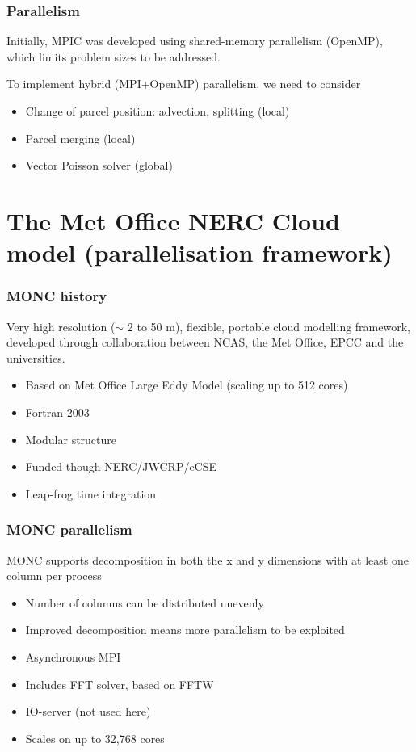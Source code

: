 \documentclass{beamer}
\begin{document}
\begin{frame}
\frametitle{Parallelism}

Initially, MPIC was developed using shared-memory parallelism (OpenMP), which limits problem sizes to be addressed.

To implement hybrid (MPI+OpenMP) parallelism, we need to consider

\begin{itemize}
\item Change of parcel position: advection, splitting (local)
\item Parcel merging (local)
\item Vector Poisson solver (global)
\end{itemize}

\end{frame}

\section{The Met Office NERC Cloud model (parallelisation framework)}

 
\begin{frame}
\frametitle{MONC history}

Very high resolution ($\mathsf{\sim}$ 2 to 50 m), flexible, portable cloud modelling 
framework, developed through collaboration between NCAS, the Met 
Office, EPCC and the universities.
\begin{itemize}
\item Based on Met Office Large Eddy Model (scaling up to 512 cores)
\item Fortran 2003
\item Modular structure
\item Funded though NERC/JWCRP/eCSE
\item Leap-frog time integration
\end{itemize}
\end{frame}

\begin{frame}
\frametitle{MONC parallelism}

MONC supports decomposition in both the x and y dimensions with at least one column per process
\begin{itemize}
\item Number of columns can be distributed unevenly
\item Improved decomposition means more parallelism to be exploited
\item Asynchronous MPI
\item Includes FFT solver, based on FFTW
\item IO-server (not used here)
\item Scales on up to 32,768 cores
\end{itemize}
\end{frame}
\end{document}
